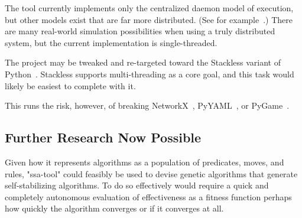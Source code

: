 \begin{task}
  \label{task:stackless}
  The tool currently implements only the centralized daemon model of execution,
    but other models exist that are far more distributed.
  (See for example~\autocite{ssa:dist}.)
  There are many real-world simulation possibilities when using a truly distributed system,
    but the current implementation is single-threaded.

  The project may be tweaked and re-targeted toward the Stackless variant of Python~\autocite{stackless}.
  Stackless supports multi-threading as a core goal, and this task would likely be easiest to complete with it.

  This runs the risk, however, of breaking NetworkX~\autocite{hagberg:networkx}, PyYAML~\autocite{pyyaml}, or PyGame~\autocite{pygame}.
\end{task}

\subsection{Further Research Now Possible}

\begin{task}
  \label{task:genetic}
  Given how it represents algorithms as a population of predicates, moves, and rules,
    "ssa-tool" could feasibly be used to devise genetic algorithms that generate
    self-stabilizing algorithms.
  To do so effectively would require a quick and completely autonomous
    evaluation of effectiveness as a fitness function \Dash
    perhaps how quickly the algorithm converges or if it converges at all.
\end{task}

